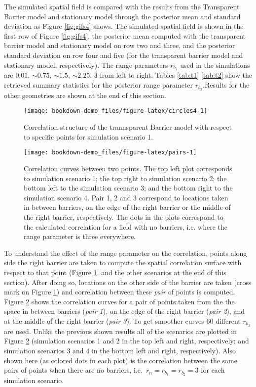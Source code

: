 \documentclass[
]{book}
\begin{document}
The simulated spatial field is compared with the results from the Transparent Barrier model and stationary model through the posterior mean and standard deviation as Figure \ref{fig:gifs4} shows. The simulated spatial field is shown in the first row of Figure \ref{fig:gifs4}, the posterior mean computed with the transparent barrier model and stationary model on row two and three, and the posterior standard deviation on row four and five (for the transparent barrier model and stationary model, respectively). The range parameters \(r_{b_2}\) used in the simulations are \(0.01\), \(\sim0.75\), \(\sim1.5\), \(\sim2.25\), \(3\) from left to right. Tables \ref{tab:t1} \ref{tab:t2} show the retrieved summary statistics for the posterior range parameter \(r_{b_2}\).Results for the other geometries are shown at the end of this section.

\begin{figure}
\texttt{[image: bookdown-demo\_files/figure-latex/circles4-1]} \caption{Correlation structure of the trannsparent Barrier model with respect to specific points for simulation scenario 1.}\label{fig:circles4}
\end{figure}

\begin{figure}
\texttt{[image: bookdown-demo\_files/figure-latex/pairs-1]} \caption{Correlation curves between two points. The top left plot corresponds to simulation scenario 1; the top right to simulation scenario 2; the bottom left to the simulation scenario 3; and the bottom right to the simulation scenario 4. Pair 1, 2 and 3 correspond to locations taken in between barriers, on the edge of the right barrier or the middle of the right barrier, respectively. The dots in the plots correspond to the calculated correlation for a field with no barriers, i.e. where the range parameter is three everywhere.}\label{fig:pairs}
\end{figure}

To understand the effect of the range parameter on the correlation, points along side the right barrier are taken to compute the spatial correlation surface with respect to that point (Figure \ref{fig:circles4}, and the other scenarios at the end of this section). After doing so, locations on the other side of the barrier are taken (cross mark on Figure \ref{fig:circles4}) and correlation between these \emph{pair} of points is computed. Figure \ref{fig:pairs} shows the correlation curves for a pair of points taken from the the space in between barriers (\emph{pair 1}), on the edge of the right barrier (\emph{pair 2}), and at the middle of the right barrier (\emph{pair 3}). To get smoother curves \(60\) different \(r_{b_2}\) are used. Unlike the previous shown results all of the scenarios are plotted in Figure \ref{fig:pairs} (simulation scenarios 1 and 2 in the top left and right, respectively; and simulation scenarios 3 and 4 in the bottom left and right, respectively). Also shown here (as colored dots in each plot) is the correlation between the same pairs of points when there are no barriers, i.e.~\(r_n=r_{b_1}=r_{b_2}=3\) for each simulation scenario.
\end{document}
